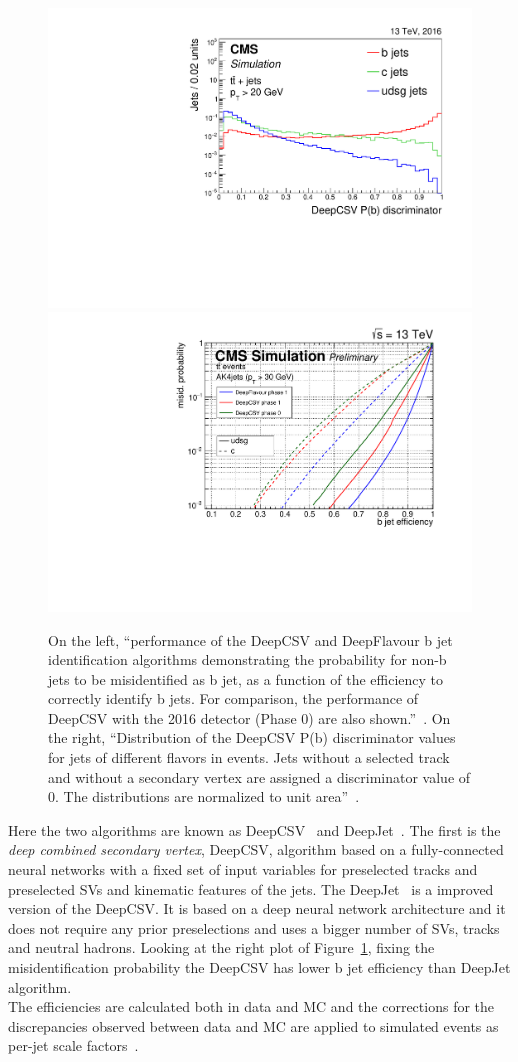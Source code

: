 \begin{figure}[h]
\centering
\includegraphics[width=.49\textwidth]{Figures/c2/CMS-BTV-16-002_Figure_013-a.pdf}
\includegraphics[width=.49\textwidth]{Figures/c2/PT30GeV.pdf}
\caption{On the left, ``performance of the DeepCSV and DeepFlavour b
  jet identification algorithms demonstrating the probability for
  non-b jets to be misidentified as b jet, as a function of the
  efficiency to correctly identify b jets. For comparison, the performance of DeepCSV
  with the 2016 detector (Phase 0) are also shown.''~\cite{csv}. On
  the right, ``Distribution of the DeepCSV P(b) discriminator values
  for jets of different flavors in \ttbar events. Jets without a
  selected track and without a secondary vertex are assigned a
  discriminator value of 0. The distributions are normalized to unit area''~\cite{csv}.}
\label{fig:taggingperformance}
\end{figure}

Here the two algorithms are known as DeepCSV~\cite{csv} and 
DeepJet~\cite{deep}. The first is the \emph{deep combined secondary vertex}, DeepCSV,
algorithm based on a fully-connected neural networks with a fixed set
of input variables for preselected tracks and preselected SVs and
kinematic features of the jets. The DeepJet~\cite{deep} is a improved
version of the DeepCSV. It is based on a deep neural network
architecture and it does not require any prior preselections and uses
a bigger number of SVs, tracks and neutral hadrons.
Looking at the right plot of Figure~\ref{fig:taggingperformance},
fixing the misidentification probability the DeepCSV has lower b jet
efficiency than DeepJet algorithm.\\
The efficiencies are calculated both in data and MC and the
corrections for the discrepancies observed between data and MC are
applied to simulated events as per-jet scale factors~\cite{csv}.



